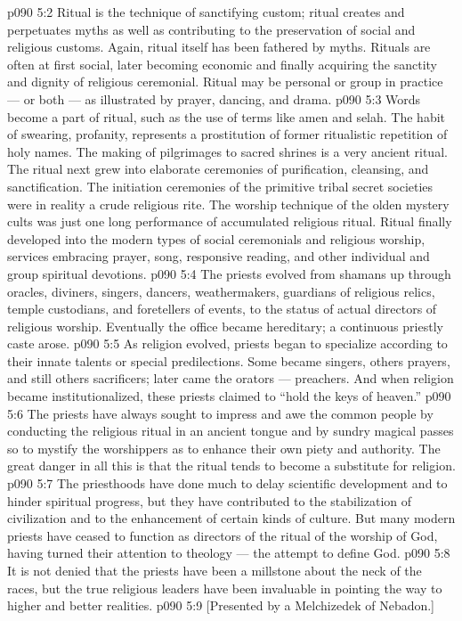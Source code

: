 \vs p090 5:2 Ritual is the technique of sanctifying custom; ritual creates and perpetuates myths as well as contributing to the preservation of social and religious customs. Again, ritual itself has been fathered by myths. Rituals are often at first social, later becoming economic and finally acquiring the sanctity and dignity of religious ceremonial. Ritual may be personal or group in practice --- or both --- as illustrated by prayer, dancing, and drama.
\vs p090 5:3 Words become a part of ritual, such as the use of terms like amen and selah. The habit of swearing, profanity, represents a prostitution of former ritualistic repetition of holy names. The making of pilgrimages to sacred shrines is a very ancient ritual. The ritual next grew into elaborate ceremonies of purification, cleansing, and sanctification. The initiation ceremonies of the primitive tribal secret societies were in reality a crude religious rite. The worship technique of the olden mystery cults was just one long performance of accumulated religious ritual. Ritual finally developed into the modern types of social ceremonials and religious worship, services embracing prayer, song, responsive reading, and other individual and group spiritual devotions.
\vs p090 5:4 \pc The priests evolved from shamans up through oracles, diviners, singers, dancers, weathermakers, guardians of religious relics, temple custodians, and foretellers of events, to the status of actual directors of religious worship. Eventually the office became hereditary; a continuous priestly caste arose.
\vs p090 5:5 As religion evolved, priests began to specialize according to their innate talents or special predilections. Some became singers, others prayers, and still others sacrificers; later came the orators --- preachers. And when religion became institutionalized, these priests claimed to “hold the keys of heaven.”
\vs p090 5:6 The priests have always sought to impress and awe the common people by conducting the religious ritual in an ancient tongue and by sundry magical passes so to mystify the worshippers as to enhance their own piety and authority. The great danger in all this is that the ritual tends to become a substitute for religion.
\vs p090 5:7 The priesthoods have done much to delay scientific development and to hinder spiritual progress, but they have contributed to the stabilization of civilization and to the enhancement of certain kinds of culture. But many modern priests have ceased to function as directors of the ritual of the worship of God, having turned their attention to theology --- the attempt to define God.
\vs p090 5:8 It is not denied that the priests have been a millstone about the neck of the races, but the true religious leaders have been invaluable in pointing the way to higher and better realities.
\vsetoff
\vs p090 5:9 [Presented by a Melchizedek of Nebadon.]
